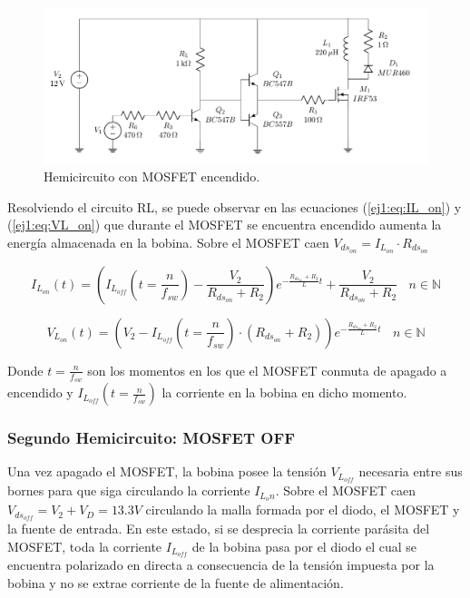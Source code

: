 \begin{figure}[H]
	\centering
	\includegraphics[width=0.4\linewidth, page=3]{ImagenesEjercicio-1/CircuitsEj1}
	\caption{Hemicircuito con MOSFET encendido.}
	\label{ej1:fig:circuito_on}
\end{figure}

Resolviendo el circuito RL, se puede observar en las ecuaciones (\ref{ej1:eq:IL_on}) y (\ref{ej1:eq:VL_on}) que durante el MOSFET se encuentra encendido aumenta la energía almacenada en la bobina. Sobre el MOSFET caen $V_{ds_{on}} = I_{L_{on}}\cdot R_{ds_{on}}$

\begin{equation}
	 I_{L_{on}}(t) = \left( I_{L_{off}}\left(t= \frac{n}{f_{sw}}\right) -\frac{V_2}{R_{ds_{on}}+R_2}\right) e^{-\frac{R_{ds_{on}}+R_2}{L}t} + \frac{V_2}{R_{ds_{on}}+R_2} \ \ \ \ n \in \mathbb{N}
\label{ej1:eq:IL_on}
\end{equation}

\begin{equation}
	V_{L_{on}}(t) = \left( V_2 - I_{L_{off}}\left(t= \frac{n}{f_{sw}}\right)\cdot (R_{ds_{on}}+R_2) \right)e^{-\frac{R_{ds_{on}}+R_2}{L}t} \ \ \ \ n \in \mathbb{N}
\label{ej1:eq:VL_on}
\end{equation}

Donde $t=\frac{n}{f_{sw}}$ son los momentos en los que el MOSFET conmuta de apagado a encendido y $I_{L_{off}}\left(t= \frac{n}{f_{sw}}\right)$ la corriente en la bobina en dicho momento.

\subsubsection{Segundo Hemicircuito: MOSFET OFF}

Una vez apagado el MOSFET, la bobina posee la tensión $V_{L_{off}}$ necesaria entre sus bornes para que siga circulando la corriente $I_{L_on}$. Sobre el MOSFET caen $V_{ds_{off}} = V_2 + V_D = 13.3V$ circulando la malla formada por el diodo, el MOSFET y la fuente de entrada. En este estado, si se desprecia la corriente parásita del MOSFET, toda la corriente $I_{L_{off}}$ de la bobina pasa por el diodo el cual se encuentra polarizado en directa a consecuencia de la tensión impuesta por la bobina y no se extrae corriente de la fuente de alimentación.

